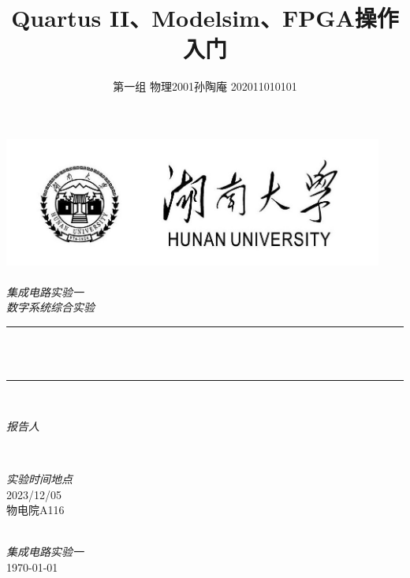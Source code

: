 \documentclass[12pt]{article}
\title{Quartus II、Modelsim、FPGA操作入门}
\author{第一组 物理2001孙陶庵 202011010101}
\begin{document}
\def\hbar{\text{\textit{ħ}}}

    \renewcommand\theequation{\thesubsection.\arabic{equation}}
    \newtheorem{mythm}{定理}[section]  %

\begin{titlepage}
	\newcommand{\HRule}{\rule{\linewidth}{0.5mm}}
	\includegraphics[width=12.5cm]{sc_logo.jpg}\\[0cm] 
	\center 
	\quad\\[1.5cm]
	\textsl{\Large 集成电路实验一 }\\[0.5cm] 
	\textsl{\large 数字系统综合实验}\\[0.5cm] 
	\makeatletter
	\HRule \\[0.4cm]
	{ \huge \bfseries \@title}\\[0.4cm] 
	\HRule \\[1.5cm]
	\begin{minipage}{0.4\textwidth}
		\begin{flushleft} \large
			\emph{报告人}\\
			\@author 
		\end{flushleft}
	\end{minipage}
	~
	\begin{minipage}{0.4\textwidth}
		\begin{flushright} \large
			\emph{实验时间地点} \\
			\textup{2023/12/05\\物电院A116}
		\end{flushright}
	\end{minipage}\\[3cm]
	\makeatother
	{\large \emph{集成电路实验一}}\\[0.5cm]
	{\large \today}\\[2cm] 
	\vfill 
\end{titlepage}
\thispagestyle{empty}
\clearpage     %
\tableofcontents        %
\clearpage     %
\end{document}
